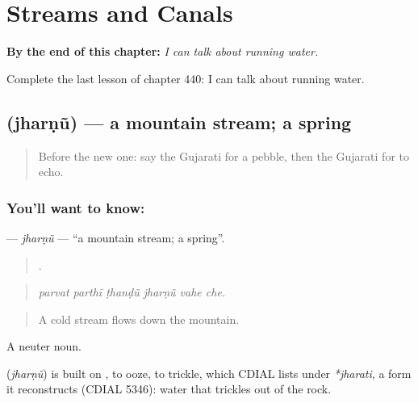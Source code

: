 
\chapter{Streams and Canals}
\label{ch:gu-streams-and-canals}

\begin{chapteropening}
\textbf{By the end of this chapter:} \emph{I can talk about running water.}

Complete the last lesson of chapter 440: I can talk about running water.
\end{chapteropening}

\section[\texorpdfstring{\gu{ઝરણું} (jharṇũ)}{ઝરણું (jharṇũ)}]{ (jharṇũ) — a mountain stream; a spring}

\label{lesson:GU-C440-jharnu}



\begin{quote}
Before the new one: say the Gujarati for a pebble, then the Gujarati for to echo.
\end{quote}

\subsection*{You'll want to know: }
\textbf{} — \emph{jharṇũ} — \textquotedblleft{}a mountain stream; a spring\textquotedblright{}.

\begin{quote}
     .
\end{quote}

\begin{quote}
\emph{parvat parthī ṭhanḍũ jharṇũ vahe che.}
\end{quote}

\begin{quote}
A cold stream flows down the mountain.
\end{quote}

A neuter noun.

\begin{cousinweb}
\textbf{} (\emph{jharṇũ}) is built on , to ooze, to trickle, which CDIAL lists under \emph{*jharati}, a form it reconstructs (CDIAL 5346): water that trickles out of the rock.
\end{cousinweb}

